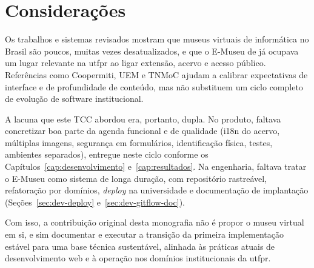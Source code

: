 \section{Considerações}\label{sec:trab-consideracoes}

Os trabalhos e sistemas revisados mostram que museus virtuais de informática no Brasil são poucos, muitas vezes desatualizados, e que o E-Museu de  já ocupava um lugar relevante na \acrshort{utfpr} ao ligar extensão, acervo e acesso público. Referências como Coopermiti, UEM e TNMoC ajudam a calibrar expectativas de interface e de profundidade de conteúdo, mas não substituem um ciclo completo de evolução de software institucional.

A lacuna que este TCC abordou era, portanto, dupla. No produto, faltava concretizar boa parte da agenda funcional e de qualidade (i18n do acervo, múltiplas imagens, segurança em formulários, identificação física, testes, ambientes separados), entregue neste ciclo conforme os Capítulos~\ref{cap:desenvolvimento} e~\ref{cap:resultados}. Na engenharia, faltava tratar o E-Museu como sistema de longa duração, com repositório rastreável, refatoração por domínios, \textit{deploy} na universidade e documentação de implantação (Seções~\ref{sec:dev-deploy} e~\ref{sec:dev-gitflow-doc}).

Com isso, a contribuição original desta monografia não é propor o museu virtual em si, e sim documentar e executar a transição da primeira implementação estável para uma base técnica sustentável, alinhada às práticas atuais de desenvolvimento web e à operação nos domínios institucionais da \acrshort{utfpr}.
